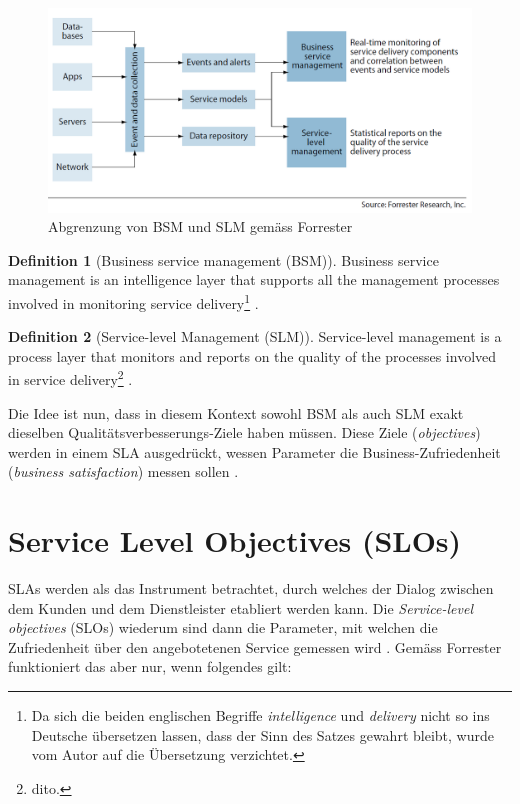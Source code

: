 \documentclass[11pt,listof=totoc]{scrreprt} %
\theoremstyle{definition}
\newtheorem{definition}{Definition}
\begin{document}
\begin{figure}
\label{forr}
\caption{Abgrenzung von BSM und SLM gemäss Forrester}
\includegraphics[scale=0.47]{biltli/forrester_bsm_slm.png}
\end{figure}

\begin{definition}[Business service management (BSM)] Business service management is an intelligence layer that supports all the management processes involved in monitoring service delivery\footnote{Da sich die beiden englischen Begriffe {\em intelligence} und {\em delivery} nicht so ins Deutsche übersetzen lassen, dass der Sinn des Satzes gewahrt bleibt, wurde vom Autor auf die Übersetzung verzichtet.} \cite{forrester:slaBestPractices}.
\end{definition}

\begin{definition}[Service-level Management (SLM)]
Service-level management is a process layer that monitors and reports on the quality of
the processes involved in service delivery\footnote{dito.} \cite{forrester:slaBestPractices}.
\end{definition}

Die Idee ist nun, dass in diesem Kontext sowohl BSM als auch SLM exakt dieselben Qualitätsverbesserungs-Ziele haben müssen. Diese Ziele ({\em objectives}) werden in einem SLA ausgedrückt, wessen Parameter die Business-Zufriedenheit ({\em business satisfaction}) messen sollen \cite{forrester:slaBestPractices, EllisKauferstein200311}.

\section{Service Level Objectives (SLOs)}

SLAs werden als das Instrument betrachtet, durch welches der Dialog zwischen dem Kunden und dem Dienstleister etabliert werden kann. Die {\em Service-level objectives} (SLOs) wiederum sind dann die Parameter, mit welchen die Zufriedenheit über den angebotetenen Service gemessen wird \cite{forrester:slaBestPractices}. Gemäss Forrester funktioniert das aber nur, wenn folgendes gilt:
\end{document}
